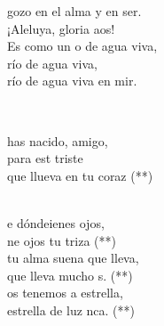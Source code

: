 \documentclass[12pt]{article}
\begin{document}
\begin{multicols*}{2}
\begin{cancion}
\begin{chorus}
            gozo en el alma y en ser.\\
            ¡Aleluya, gloria aos!\\
            Es como un o de agua viva, \\
        río de agua viva,\\
            río de agua viva en mir. \\
            \end{chorus}%
            \jump\\
        \end{cancion}%
        
        \begin{cancion}%
            \begin{chorus}%
            has nacido, amigo,\\
            para est triste\\
            que llueva en tu coraz (**)\\
            \end{chorus}%
            \jump\\
            e dóndeienes ojos,\\
            ne ojos tu triza (**)\\
        \jump
            tu alma suena  que lleva,\\
            que lleva mucho s. (**)\\
        \jump
            os tenemos a estrella,\\
             estrella de luz nca. (**)\\
        \end{cancion}%
        

\end{multicols*}
\end{document}
